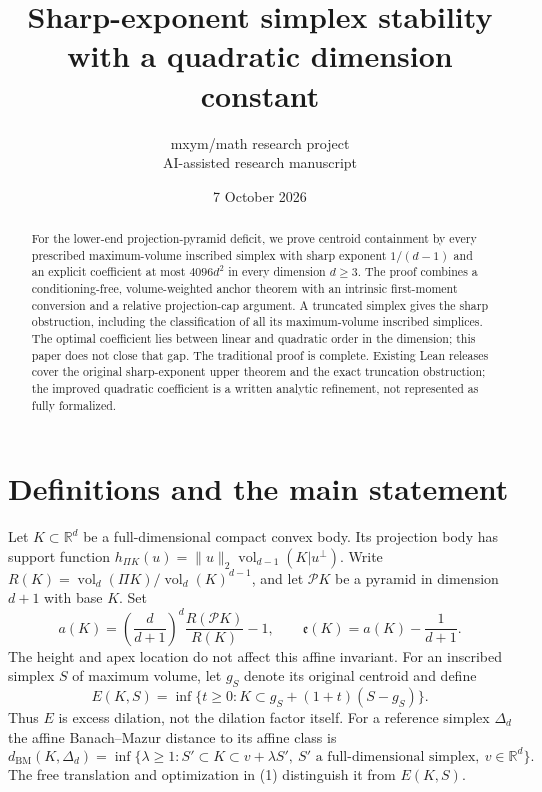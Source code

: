 \documentclass[11pt]{article}
\title{Sharp-exponent simplex stability with a quadratic dimension constant}
\author{mxym/math research project\\AI-assisted research manuscript}
\date{7 October 2026}
\newcommand{\vol}{\operatorname{vol}}
\newcommand{\BM}{d_{\mathrm{BM}}}
\newcommand{\ee}{\mathfrak e}
\newcommand{\R}{\mathbb R}
\begin{document}
\maketitle
\begin{abstract}
For the lower-end projection-pyramid deficit, we prove centroid containment by
every prescribed maximum-volume inscribed simplex with sharp exponent
$1/(d-1)$ and an explicit coefficient at most $4096d^2$ in every dimension
$d\ge3$. The proof combines a conditioning-free, volume-weighted anchor
theorem with an intrinsic first-moment conversion and a relative projection-cap
argument. A truncated simplex gives the sharp obstruction, including the
classification of all its maximum-volume inscribed simplices. The optimal
coefficient lies between linear and quadratic order in the dimension; this
paper does not close that gap. The traditional proof is complete. Existing
Lean releases cover the original sharp-exponent upper theorem and the exact
truncation obstruction; the improved quadratic coefficient is a written
analytic refinement, not represented as fully formalized.
\end{abstract}

\section{Definitions and the main statement}
Let $K\subset\R^d$ be a full-dimensional compact convex body. Its projection
body has support function $h_{\Pi K}(u)=\|u\|_2\vol_{d-1}(K|u^\perp)$.
Write $R(K)=\vol_d(\Pi K)/\vol_d(K)^{d-1}$, and let $\mathcal P K$ be a
pyramid in dimension $d+1$ with base $K$. Set
\[
a(K)=\left(\frac d{d+1}\right)^d\frac{R(\mathcal P K)}{R(K)}-1,
\qquad \ee(K)=a(K)-\frac1{d+1}.
\]
The height and apex location do not affect this affine invariant. For an
inscribed simplex $S$ of maximum volume, let $g_S$ denote its original centroid
and define
\[
E(K,S)=\inf\{t\ge0:K\subset g_S+(1+t)(S-g_S)\}.
\]
Thus $E$ is excess dilation, not the dilation factor itself. For a reference
simplex $\Delta_d$ the affine Banach--Mazur distance to its affine class is
\[
\BM(K,\Delta_d)=\inf\{\lambda\ge1:S'\subset K\subset v+\lambda S',
\ S'\text{ a full-dimensional simplex},\ v\in\R^d\}. \tag{1}
\]
The free translation and optimization in (1) distinguish it from $E(K,S)$.
\end{document}
